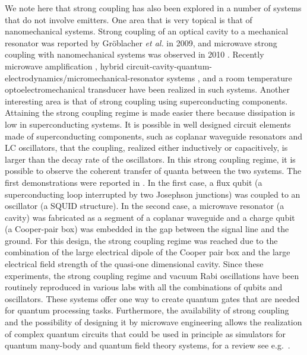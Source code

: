 \documentclass[12pt]{iopart}
\begin{document}
We note here that strong coupling has also been explored in a number of systems that do not involve emitters. One area that is very topical is that of nanomechanical systems. Strong coupling of an optical cavity to a mechanical resonator was reported by Gr\"oblacher {\it et al.} \cite{Groblacher_Nature_2009_460_724} in 2009, and microwave strong coupling with nanomechanical systems was observed in 2010 \cite{OConnell2010}. Recently microwave amplification \cite{Massel2011}, hybrid circuit-cavity-quantum-electrodynamics/micromechanical-resonator systems \cite{Pirkkalainen2013}, and a room temperature optoelectromechanical transducer \cite{Bagci2014} have been realized in such systems. Another interesting area is that of strong coupling using superconducting components. Attaining the strong coupling regime is made easier there because dissipation is low in superconducting systems. It is possible in well designed circuit elements made of superconducting components, such as coplanar waveguide resonators and LC oscillators, that the coupling, realized either inductively or capacitively, is larger than the decay rate of the oscillators.  In this strong coupling regime, it is possible to observe the coherent transfer of quanta between the two systems.  The first demonstrations were reported in \cite{Chiorescu2004,Wallraff}.  In the first case, a flux qubit (a superconducting loop interrupted by two Josephson junctions) was coupled to an oscillator (a SQUID structure). In the second case, a microwave resonator (a cavity) was fabricated as a segment of a coplanar waveguide and a charge qubit (a Cooper-pair box) was embedded in the  gap between the signal line and the ground. For this design, the strong coupling regime was reached due to the combination of the large electrical dipole of the Cooper pair box and the large electrical field strength of the quasi-one dimensional cavity. Since these experiments, the strong coupling regime and vacuum Rabi oscillations have been routinely reproduced in various labs with all the combinations of qubits and oscillators. These systems offer one way to create quantum gates that are needed for quantum processing tasks. Furthermore, the availability of strong coupling and the possibility of designing it by microwave engineering allows the realization of complex quantum circuits that could be used in principle as simulators for quantum many-body and quantum field theory systems, for a review see e.g.\ \cite{Paraoanu2014}.  
\end{document}
